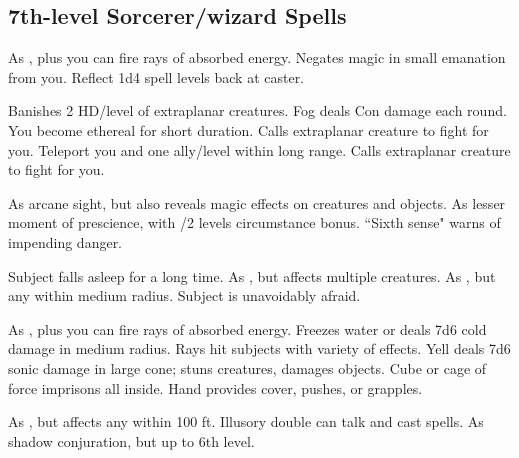 \subsection{7th-level Sorcerer/wizard Spells}
\begin{swspelllist}
 As , plus you can fire rays of absorbed energy.
\spellhead{}
 Negates magic in small emanation from you.
 Reflect 1d4 spell levels back at caster.

 Banishes 2 HD/level of extraplanar creatures.
 Fog deals Con damage each round.
 You become ethereal for short duration.
 Calls extraplanar creature to fight for you.
 Teleport you and one ally/level within long range.
 Calls extraplanar creature to fight for you.

 As arcane sight, but also reveals magic effects on creatures and objects.
 As lesser moment of prescience, with /2 levels circumstance bonus.
 ``Sixth sense" warns of impending danger.
\spellheadrestricted{}

 Subject falls asleep for a long time.
 As , but affects multiple creatures.
 As , but any within medium radius.
 Subject is unavoidably afraid.

 As , plus you can fire rays of absorbed energy.
 Freezes water or deals 7d6 cold damage in medium radius.
 Rays hit subjects with variety of effects.
 Yell deals 7d6 sonic damage in large cone; stuns creatures, damages objects.
\M Cube or cage of force imprisons all inside.
 Hand provides cover, pushes, or grapples.

 As , but affects any within 100 ft.
 Illusory double can talk and cast spells.
 As shadow conjuration, but up to 6th level.


\end{swspelllist}

